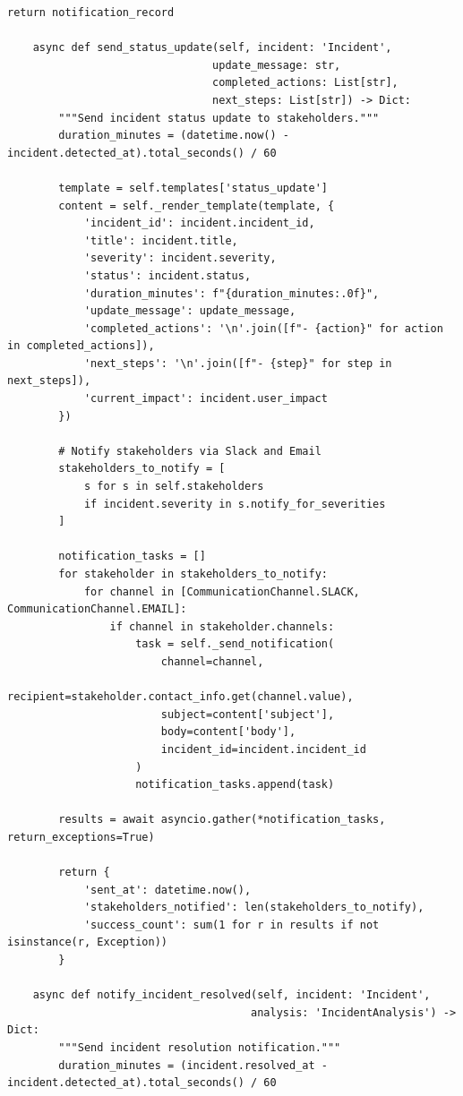 \begin{lstlisting}[style=python, caption={Incident communication with multi-channel notifications}]
        return notification_record

    async def send_status_update(self, incident: 'Incident',
                                update_message: str,
                                completed_actions: List[str],
                                next_steps: List[str]) -> Dict:
        """Send incident status update to stakeholders."""
        duration_minutes = (datetime.now() - incident.detected_at).total_seconds() / 60

        template = self.templates['status_update']
        content = self._render_template(template, {
            'incident_id': incident.incident_id,
            'title': incident.title,
            'severity': incident.severity,
            'status': incident.status,
            'duration_minutes': f"{duration_minutes:.0f}",
            'update_message': update_message,
            'completed_actions': '\n'.join([f"- {action}" for action in completed_actions]),
            'next_steps': '\n'.join([f"- {step}" for step in next_steps]),
            'current_impact': incident.user_impact
        })

        # Notify stakeholders via Slack and Email
        stakeholders_to_notify = [
            s for s in self.stakeholders
            if incident.severity in s.notify_for_severities
        ]

        notification_tasks = []
        for stakeholder in stakeholders_to_notify:
            for channel in [CommunicationChannel.SLACK, CommunicationChannel.EMAIL]:
                if channel in stakeholder.channels:
                    task = self._send_notification(
                        channel=channel,
                        recipient=stakeholder.contact_info.get(channel.value),
                        subject=content['subject'],
                        body=content['body'],
                        incident_id=incident.incident_id
                    )
                    notification_tasks.append(task)

        results = await asyncio.gather(*notification_tasks, return_exceptions=True)

        return {
            'sent_at': datetime.now(),
            'stakeholders_notified': len(stakeholders_to_notify),
            'success_count': sum(1 for r in results if not isinstance(r, Exception))
        }

    async def notify_incident_resolved(self, incident: 'Incident',
                                      analysis: 'IncidentAnalysis') -> Dict:
        """Send incident resolution notification."""
        duration_minutes = (incident.resolved_at - incident.detected_at).total_seconds() / 60


\end{lstlisting}
